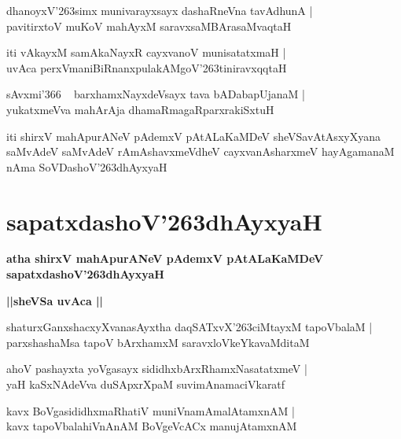 \documentclass[twoside,12pt,openright]{book}
\def\S{\char'263}
\newcounter{shloka}[chapter]
\def\uvaca#1{\centerline{{\large\textbf{#1}}}}
\begin{document}
\begin{shloka}%
dhanoyxV\S simx munivarayxsayx dashaRneVna tavAdhunA |\\
pavitirxtoV muKoV mahAyxM saravxsaMBArasaMvaqtaH 
\end{shloka}

\begin{shloka}%
iti vAkayxM samAkaNayxR cayxvanoV munisatatxmaH |\\
uvAca perxVmaniBiRnanxpulakAMgoV\S tiniravxqqtaH 
\end{shloka}

\begin{shloka}%
sAvxmi\char'366 ~ barxhamxNayxdeVsayx tava bADabapUjanaM |\\
yukatxmeVva mahArAja dhamaRmagaRparxrakiSxtuH 
\end{shloka}

\begin{center}
iti shirxV mahApurANeV pAdemxV pAtALaKaMDeV sheVSavAtAsxyXyana saMvAdeV 
saMvAdeV rAmAshavxmeVdheV cayxvanAsharxmeV hayAgamanaM nAma SoVDashoV\S dhAyxyaH
\end{center}

\chapter{sapatxdashoV\S dhAyxyaH}

\begin{center}
{\LARGE\bfseries atha shirxV mahApurANeV pAdemxV pAtALaKaMDeV sapatxdashoV\S dhAyxyaH}
\end{center}

\uvaca{||sheVSa uvAca ||}

\begin{shloka}%
shaturxGanxshacxyXvanasAyxtha daqSATxvX\S ciMtayxM  tapoVbalaM |\\
parxshashaMsa tapoV bArxhamxM saravxloVkeYkavaMditaM 
\end{shloka}

\begin{shloka}%
ahoV pashayxta yoVgasayx sididhxbArxRhamxNasatatxmeV |\\
yaH kaSxNAdeVva duSApxrXpaM suvimAnamaciVkaratf 
\end{shloka}

\begin{shloka}%
kavx BoVgasididhxmaRhatiV muniVnamAmalAtamxnAM |\\
kavx tapoVbalahiVnAnAM BoVgeVcACx manujAtamxnAM 
\end{shloka}
\end{document}
